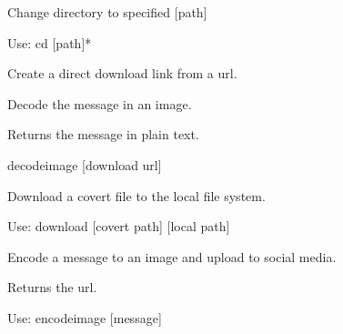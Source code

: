 \documentclass[letterpaper,10pt,english]{sphinxmanual}
\begin{document}
\begin{fulllineitems}
\begin{fulllineitems}
\label{main:main.Console.do_cd}
Change directory to specified {[}path{]}

Use: cd {[}path{]}*

\end{fulllineitems}


\begin{fulllineitems}
\label{main:main.Console.do_createdownloadlink}
Create a direct download link from a url.

\end{fulllineitems}


\begin{fulllineitems}
\label{main:main.Console.do_decodeimage}
Decode the message in an image.

Returns the message in plain text.

decodeimage {[}download url{]}

\end{fulllineitems}


\begin{fulllineitems}
\label{main:main.Console.do_download}
Download a covert file to the local file system.

Use: download {[}covert path{]} {[}local path{]}

\end{fulllineitems}


\begin{fulllineitems}
\label{main:main.Console.do_encodeimage}
Encode a message to an image and upload to social media.

Returns the url.

Use: encodeimage {[}message{]}

\end{fulllineitems}


\end{fulllineitems}
\end{document}
